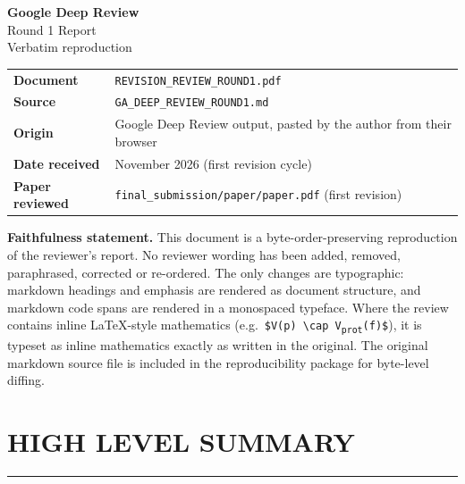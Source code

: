 \documentclass[11pt,a4paper]{article}
\begin{document}
\begin{titlepage}
\vspace*{2.8cm}
{\color{ink}\Huge\bfseries Google Deep Review\\\bigskip}
{\color{ink}\Large Round 1 Report\\\bigskip}
{\color{quote}\large Verbatim reproduction}\vspace{1.5cm}

\begin{tabular}{@{}ll@{}}
\textbf{Document} & \texttt{REVISION\_REVIEW\_ROUND1.pdf} \\
\textbf{Source} & \texttt{GA\_DEEP\_REVIEW\_ROUND1.md} \\
\textbf{Origin} & Google Deep Review output, pasted by the author from their browser \\
\textbf{Date received} & November 2026 (first revision cycle) \\
\textbf{Paper reviewed} & \texttt{final\_submission/paper/paper.pdf} (first revision) \\
\bottomrule
\end{tabular}

\vspace{1.0cm}
\noindent\textbf{Faithfulness statement.} This document is a byte-order-preserving
reproduction of the reviewer's report. No reviewer wording has been added, removed,
paraphrased, corrected or re-ordered. The only changes are typographic: markdown
headings and emphasis are rendered as document structure, and markdown code spans
are rendered in a monospaced typeface. Where the review contains inline LaTeX-style
mathematics (e.g.\ \texttt{\$V(p) \textbackslash cap V\textsubscript{prot}(f)\$}),
it is typeset as inline mathematics exactly as written in the original. The original
markdown source file is included in the reproducibility package for byte-level diffing.

\vfill
\end{titlepage}
\section*{HIGH LEVEL SUMMARY}
\par\medskip\noindent\rule{\linewidth}{0.4pt}\medskip\par
\end{document}
